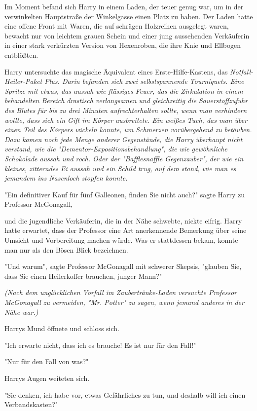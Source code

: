 {Im Moment befand sich Harry in einem Laden, der teuer genug war, um in der verwinkelten Hauptstraße der Winkelgasse einen Platz zu haben. Der Laden hatte eine offene Front mit Waren, die auf schrägen Holzreihen ausgelegt waren, bewacht nur von leichtem grauen Schein und einer jung aussehenden Verkäuferin in einer stark verkürzten Version von Hexenroben, die ihre Knie und Ellbogen entblößten.

Harry untersuchte das magische Äquivalent eines Erste-Hilfe-Kastens, das \emph{Notfall-Heiler-Paket Plus. Darin befanden sich zwei selbstspannende Tourniquets. Eine Spritze mit etwas, das aussah wie flüssiges Feuer, das die Zirkulation in einem behandelten Bereich drastisch verlangsamen und gleichzeitig die Sauerstoffzufuhr des Blutes für bis zu drei Minuten aufrechterhalten sollte, wenn man verhindern wollte, dass sich ein Gift im Körper ausbreitete. Ein weißes Tuch, das man über einen Teil des Körpers wickeln konnte, um Schmerzen vorübergehend zu betäuben. Dazu kamen noch jede Menge anderer Gegenstände, die Harry überhaupt nicht verstand, wie die "Dementor-Expositionsbehandlung", die wie gewöhnliche Schokolade aussah und roch. Oder der "Bafflesnaffle Gegenzauber", der wie ein kleines, zitterndes Ei aussah und ein Schild trug, auf dem stand, wie man es jemandem ins Nasenloch stopfen konnte.}

"Ein definitiver Kauf für fünf Galleonen, finden Sie nicht auch?" sagte Harry zu Professor McGonagall,

und die jugendliche Verkäuferin, die in der Nähe schwebte, nickte eifrig. Harry hatte erwartet, dass der Professor eine Art anerkennende Bemerkung über seine Umsicht und Vorbereitung machen würde. Was er stattdessen bekam, konnte man nur als den Bösen Blick bezeichnen.

"Und warum", sagte Professor McGonagall mit schwerer Skepsis, "glauben Sie, dass Sie einen Heilerkoffer brauchen, junger Mann?"

\emph{(Nach dem unglücklichen Vorfall im Zaubertränke-Laden versuchte Professor McGonagall zu vermeiden, "Mr. Potter" zu sagen, wenn jemand anderes in der Nähe war.)}

Harrys Mund öffnete und schloss sich.

"Ich erwarte nicht, dass ich es brauche! Es ist nur für den Fall!"

"Nur für den Fall von was?"

Harrys Augen weiteten sich.

"Sie denken, ich habe vor, etwas Gefährliches zu tun, und deshalb will ich einen Verbandskasten?"

}
